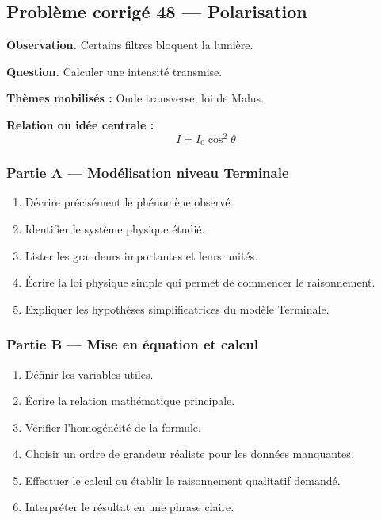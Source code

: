 \documentclass[11pt,a4paper]{article}
\begin{document}
\subsection{Problème corrigé 48 — Polarisation}

\begin{exercicebox}
\textbf{Observation.} Certains filtres bloquent la lumière.

\medskip
\textbf{Question.} Calculer une intensité transmise.

\medskip
\textbf{Thèmes mobilisés :} Onde transverse, loi de Malus.

\medskip
\textbf{Relation ou idée centrale :}
\[
I=I_0\cos^2\theta
\]
\end{exercicebox}

\subsubsection*{Partie A — Modélisation niveau Terminale}

\begin{enumerate}
  \item Décrire précisément le phénomène observé.
  \item Identifier le système physique étudié.
  \item Lister les grandeurs importantes et leurs unités.
  \item Écrire la loi physique simple qui permet de commencer le raisonnement.
  \item Expliquer les hypothèses simplificatrices du modèle Terminale.
\end{enumerate}

\subsubsection*{Partie B — Mise en équation et calcul}

\begin{enumerate}
  \item Définir les variables utiles.
  \item Écrire la relation mathématique principale.
  \item Vérifier l'homogénéité de la formule.
  \item Choisir un ordre de grandeur réaliste pour les données manquantes.
  \item Effectuer le calcul ou établir le raisonnement qualitatif demandé.
  \item Interpréter le résultat en une phrase claire.
\end{enumerate}
\end{document}
